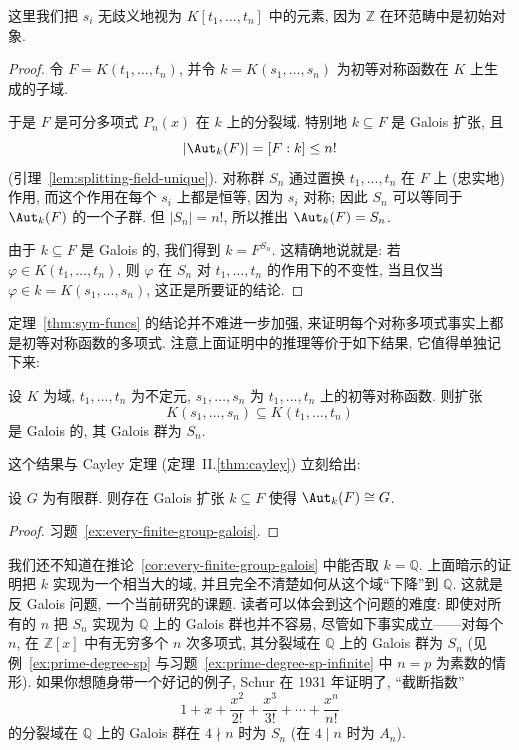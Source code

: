 这里我们把 $s_i$ 无歧义地视为 $K[t_1,\ldots,t_n]$ 中的元素, 因为 $\mathbb{Z}$ 在环范畴中是初始对象.

\begin{proof}
令 $F=K(t_1,\ldots,t_n)$, 并令 $k=K(s_1,\ldots,s_n)$ 为初等对称函数在 $K$ 上生成的子域.

于是 $F$ 是可分多项式 $P_n(x)$ 在 $k$ 上的分裂域. 特别地 $k\subseteq F$ 是 Galois 扩张, 且
\[
\lvert\Aut_k(F)\rvert=[F:k]\le n!
\]
(引理~\ref{lem:splitting-field-unique}). 对称群 $S_n$ 通过置换 $t_1,\ldots,t_n$ 在 $F$ 上 (忠实地) 作用, 而这个作用在每个 $s_i$ 上都是恒等, 因为 $s_i$ 对称; 因此 $S_n$ 可以等同于 $\Aut_k(F)$ 的一个子群. 但 $\lvert S_n\rvert=n!$, 所以推出 $\Aut_k(F)=S_n$.

由于 $k\subseteq F$ 是 Galois 的, 我们得到 $k=F^{S_n}$. 这精确地说就是: 若 $\varphi\in K(t_1,\ldots,t_n)$, 则 $\varphi$ 在 $S_n$ 对 $t_1,\ldots,t_n$ 的作用下的不变性, 当且仅当 $\varphi\in k=K(s_1,\ldots,s_n)$, 这正是所要证的结论.
\end{proof}

定理~\ref{thm:sym-funcs} 的结论并不难进一步加强, 来证明每个对称多项式事实上都是初等对称函数的多项式. 注意上面证明中的推理等价于如下结果, 它值得单独记下来:

\begin{lemma}\label{lem:sym-funcs-galois}
设 $K$ 为域, $t_1,\ldots,t_n$ 为不定元, $s_1,\ldots,s_n$ 为 $t_1,\ldots,t_n$ 上的初等对称函数. 则扩张
\[
K(s_1,\ldots,s_n)\subseteq K(t_1,\ldots,t_n)
\]
是 Galois 的, 其 Galois 群为 $S_n$.
\end{lemma}

这个结果与 Cayley 定理 (定理~II.\ref{thm:cayley}) 立刻给出:

\begin{corollary}\label{cor:every-finite-group-galois}
设 $G$ 为有限群. 则存在 Galois 扩张 $k\subseteq F$ 使得 $\Aut_k(F)\cong G$.
\end{corollary}

\begin{proof}
习题~\ref{ex:every-finite-group-galois}.
\end{proof}

我们还不知道在推论~\ref{cor:every-finite-group-galois} 中能否取 $k=\mathbb{Q}$. 上面暗示的证明把 $k$ 实现为一个相当大的域, 并且完全不清楚如何从这个域``下降''到 $\mathbb{Q}$. 这就是反 Galois 问题, 一个当前研究的课题. 读者可以体会到这个问题的难度: 即使对所有的 $n$ 把 $S_n$ 实现为 $\mathbb{Q}$ 上的 Galois 群也并不容易, 尽管如下事实成立——对每个 $n$, 在 $\mathbb{Z}[x]$ 中有无穷多个 $n$ 次多项式, 其分裂域在 $\mathbb{Q}$ 上的 Galois 群为 $S_n$ (见例~\ref{ex:prime-degree-sp} 与习题~\ref{ex:prime-degree-sp-infinite} 中 $n=p$ 为素数的情形). 如果你想随身带一个好记的例子, Schur 在 1931 年证明了, ``截断指数''
\[
1+x+\frac{x^2}{2!}+\frac{x^3}{3!}+\cdots+\frac{x^n}{n!}
\]
的分裂域在 $\mathbb{Q}$ 上的 Galois 群在 $4\nmid n$ 时为 $S_n$ (在 $4\mid n$ 时为 $A_n$).

